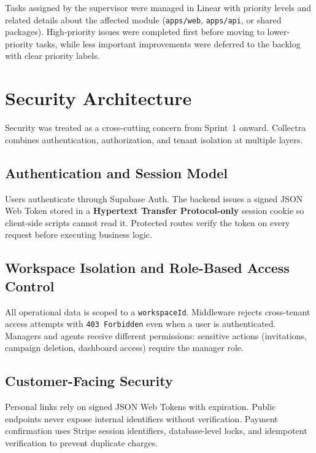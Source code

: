 \documentclass[12pt,a4paper]{report}
\begin{document}
Tasks assigned by the supervisor were managed in Linear with priority levels and related details about the affected module (\texttt{apps/web}, \texttt{apps/api}, or shared packages). High-priority issues were completed first before moving to lower-priority tasks, while less important improvements were deferred to the backlog with clear priority labels.

\section{Security Architecture}
\label{sec:security}

Security was treated as a cross-cutting concern from Sprint~1 onward.
Collectra combines authentication, authorization, and tenant isolation at multiple layers.

\subsection{Authentication and Session Model}

Users authenticate through Supabase Auth.
The backend issues a signed JSON Web Token stored in a \textbf{Hypertext Transfer Protocol-only}
session cookie so client-side scripts cannot read it.
Protected routes verify the token on every request before executing business logic.

\subsection{Workspace Isolation and Role-Based Access Control}

All operational data is scoped to a \texttt{workspaceId}.
Middleware rejects cross-tenant access attempts with \texttt{403 Forbidden} even when a user
is authenticated.
Managers and agents receive different permissions: sensitive actions (invitations, campaign
deletion, dashboard access) require the manager role.

\subsection{Customer-Facing Security}

Personal links rely on signed JSON Web Tokens with expiration.
Public endpoints never expose internal identifiers without verification.
Payment confirmation uses Stripe session identifiers, database-level locks, and idempotent
verification to prevent duplicate charges.
\end{document}
